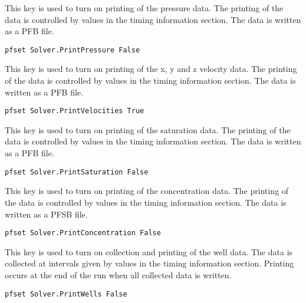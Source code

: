 {
This key is used to turn on printing of the pressure data.
The printing of the data is controlled by values in the
timing information section.  The data is written as a PFB
file.
}
\begin{display}\begin{verbatim}
pfset Solver.PrintPressure False
\end{verbatim}\end{display}

{
This key is used to turn on printing of the x, y and z
velocity data.  The printing of the data is controlled by
values in the timing information section.  The data is
written as a PFB file.
}
\begin{display}\begin{verbatim}
pfset Solver.PrintVelocities True
\end{verbatim}\end{display}

{
This key is used to turn on printing of the saturation data.
The printing of the data is controlled by values in the
timing information section.  The data is written as a PFB file.
}
\begin{display}\begin{verbatim}
pfset Solver.PrintSaturation False
\end{verbatim}\end{display}

{
This key is used to turn on printing of the concentration data.
The printing of the data is controlled by values in the
timing information section.  The data is written as a PFSB file.
}
\begin{display}\begin{verbatim}
pfset Solver.PrintConcentration False
\end{verbatim}\end{display}

{
This key is used to turn on collection and printing of the
well data.  The data is collected at intervals given by values
in the timing information section.  Printing occurs at the
end of the run when all collected data is written. 
}
\begin{display}\begin{verbatim}
pfset Solver.PrintWells False
\end{verbatim}\end{display}

